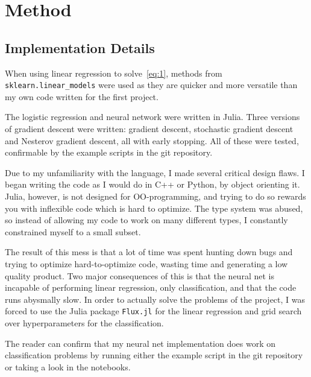 \section{Method}\label{sec:Method}


\subsection{Implementation Details}

When using linear regression to solve~\eqref{eq:1}, methods from
\texttt{sklearn.linear\_models} were used as they are quicker and more versatile
than my own code written for the first project.

The logistic regression and neural network were written in Julia. Three versions
of gradient descent were written: gradient descent, stochastic gradient descent
and Nesterov gradient descent, all with early stopping. All of these
were tested, confirmable by the example scripts in the git repository.

Due to my
unfamiliarity with the language, I made several critical design flaws. I began
writing the code as I would do in C++ or Python, by object orienting it. Julia,
however, is not designed for OO-programming, and trying to do so rewards you with
inflexible code which is hard to optimize. The type system was abused, so
instead of allowing my code to work on many different types, I constantly
constrained myself to a small subset.

The result of this mess is that a lot of time was spent hunting down bugs and
trying to optimize hard-to-optimize code, wasting time and generating a low quality
product. Two major consequences of this is that the neural net is incapable of
performing linear regression, only classification, and that the code runs
abysmally slow. In order to actually solve the problems of the project, I was
forced to use the Julia package \texttt{Flux.jl} for the linear regression and
grid search over hyperparameters for the classification. 

The reader can confirm that my neural net implementation does work on
classification problems by running
either the example script in the git repository or taking a look in the
notebooks. 

